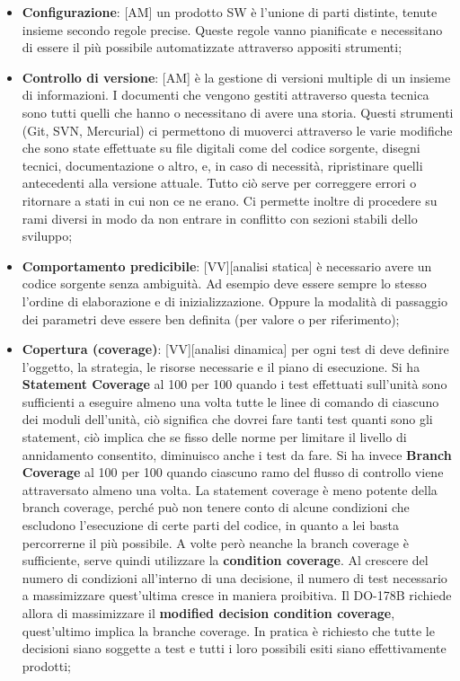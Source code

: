 \begin{itemize}
				\item \textbf{Configurazione}: [AM] un prodotto SW è l'unione di parti distinte, tenute insieme secondo regole precise. Queste regole vanno pianificate e necessitano di essere il più possibile automatizzate attraverso appositi strumenti;

				\item \textbf{Controllo di versione}: [AM]  è la gestione di versioni multiple di un insieme di informazioni. I documenti che vengono gestiti attraverso questa tecnica sono tutti quelli che hanno o necessitano di avere una storia.\newline
			Questi strumenti (Git, SVN, Mercurial) ci permettono di muoverci attraverso le varie modifiche che sono state effettuate su file digitali come del codice sorgente, disegni tecnici, documentazione o altro, e, in caso di necessità, ripristinare quelli antecedenti alla versione attuale. \newline
			Tutto ciò serve per correggere errori o ritornare a stati in cui non ce ne erano. Ci permette inoltre di procedere su rami diversi in modo da non entrare in conflitto con sezioni stabili dello sviluppo;

		\item \textbf{Comportamento predicibile}: [VV][analisi statica] è necessario avere un codice sorgente senza ambiguità. Ad esempio deve essere sempre lo stesso l'ordine di elaborazione e di inizializzazione. Oppure la modalità di passaggio dei parametri deve essere ben definita (per valore o per riferimento);

		\item \textbf{Copertura (coverage)}: [VV][analisi dinamica] per ogni test di deve definire l'oggetto, la strategia, le risorse necessarie e il piano di esecuzione. Si ha \textbf{Statement Coverage} al 100 per 100 quando i test effettuati sull'unità sono sufficienti a eseguire almeno una volta tutte le linee di comando di ciascuno dei moduli dell'unità, ciò significa che dovrei fare tanti test quanti sono gli statement, ciò implica che se fisso delle norme per limitare il livello di annidamento consentito, diminuisco anche i test da fare. Si ha invece \textbf{Branch Coverage} al 100 per 100 quando ciascuno ramo del flusso di controllo viene attraversato almeno una volta. \newline
		La statement coverage è meno potente della branch coverage, perché può non tenere conto di alcune condizioni che escludono l'esecuzione di certe parti del codice, in quanto a lei basta percorrerne il più possibile. A volte però neanche la branch coverage è sufficiente, serve quindi utilizzare la \textbf{condition coverage}. Al crescere del numero di condizioni all'interno di una decisione, il numero di test necessario a massimizzare quest'ultima cresce in maniera proibitiva. Il DO-178B richiede allora di massimizzare il \textbf{modified decision condition coverage}, quest'ultimo implica la branche coverage. In pratica è richiesto che tutte le decisioni siano soggette a test e tutti i loro possibili esiti siano effettivamente prodotti;



\end{itemize}
